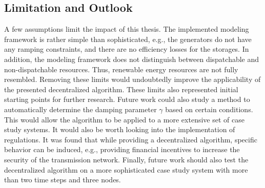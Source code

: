 \subsection{Limitation and Outlook}

A few assumptions limit the impact of this thesis. The implemented modeling framework is rather simple than sophisticated, e.g., the generators do not have any ramping constraints, and there are no efficiency losses for the storages. In addition, the modeling framework does not distinguish between dispatchable and non-dispatchable resources. Thus, renewable energy resources are not fully resembled. Removing these limits would undoubtedly improve the applicability of the presented decentralized algorithm. These limits also represented initial starting points for further research. Future work could also study a method to automatically determine the damping parameter $\gamma$ based on certain conditions. This would allow the algorithm to be applied to a more extensive set of case study systems. It would also be worth looking into the implementation of regulations. It was found that while providing a decentralized algorithm, specific behavior can be induced, e.g., providing financial incentives to increase the security of the transmission network. Finally, future work should also test the decentralized algorithm on a more sophisticated case study system with more than two time steps and three nodes.